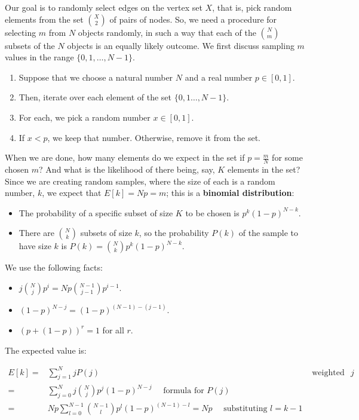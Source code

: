 \documentclass[a4paper,11pt]{article}
\begin{document}
Our goal is to randomly select edges on the vertex set $X$, that is, pick random elements from the set $\binom{X}{2}$ of pairs of nodes.
So, we need a procedure for selecting $m$ from $N$ objects randomly, in such a way that each of the $\binom{N}{m}$ subsets of the $N$ objects is an equally likely outcome.
We first discuss sampling $m$ values in the range $\{0,1, \dots, N-1 \}$.
\begin{enumerate}
    \item   Suppose that we choose a natural number $N$ and a real number $p \in [0,1]$.
    \item   Then, iterate over each element of the set $\{0,1 \dots, N-1\}$.
    \item   For each, we pick a random number $x \in [0,1]$.
    \item   If $x < p$, we keep that number.
            Otherwise, remove it from the set.
\end{enumerate}

When we are done, how many elements do we expect in the set if $p = \frac{m}{N}$ for some chosen $m$?
And what is the likelihood of there being, say, $K$ elements in the set?
Since we are creating random samples, where the size of each is a random number, $k$, we expect that $E[k] = Np = m$; this is a \textbf{binomial distribution}:
\begin{itemize}
    \item   The probability of a specific subset of size $K$ to be chosen is $p^k(1-p)^{N-k}$.
    \item   There are $\binom{N}{k}$ subsets of size $k$, so the probability $P(k)$ of the sample to have size $k$ is $P(k) = \binom{N}{k}p^k (1-p)^{N-k}$.
\end{itemize}

We use the following facts:
\begin{itemize}
    \item   $j\binom{N}{j}p^i = Np \binom{N-1}{j-1}p^{i-1}$.
    \item   $(1-p)^{N-j} = (1-p)^{(N-1) - (j-1)}$.
    \item   $(p + (1 -p))^r = 1$ for all $r$.
\end{itemize}

The expected value is:

\begin{align*}
    E[k]    =& \sum^N_{j=1}jP(j) \quad &\text{ weighted average of } j \\
            =& \sum^N_{j=0} j \binom{N}{j} p^j (1-p)^{N-j} \quad \text{ formula for } P(j) \\
            = & Np \sum^{N-1}_{l=0} \binom{N-1}{l} p^l (1-p)^{(N-1) - l} = Np \quad \text{ substituting } l=k-1
\end{align*}
\end{document}
